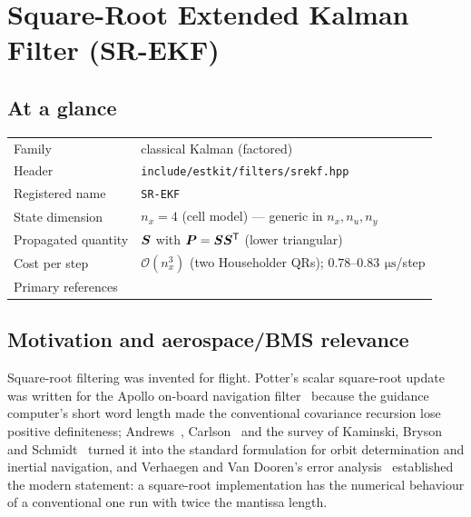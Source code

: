 \chapter{Square-Root Extended Kalman Filter (SR-EKF)}
\label{ch:srekf}

\section*{At a glance}
\begin{tabular}{@{}l>{\raggedright\arraybackslash}p{}@{}}
Family & classical Kalman (factored) \\
Header & \texttt{include/estkit/filters/srekf.hpp} \\
Registered name & \texttt{SR-EKF} \\
State dimension & $n_x = 4$ (cell model) --- generic in $n_x, n_u, n_y$ \\
Propagated quantity & $\bm{S}$ with $\bm{P} = \bm{S}\bm{S}^{\mathsf{T}}$ (lower triangular) \\
Cost per step & $\mathcal{O}(n_x^3)$ (two Householder QRs); $0.78$--$0.83\,\SI{}{\micro\second}$/step \\
Primary references & \cite{kaminski1971,kailath2000,potter1963,carlson1973,verhaegen1986} \\
\end{tabular}

\section{Motivation and aerospace/BMS relevance}
Square-root filtering was invented for flight. Potter's scalar square-root update was written
for the Apollo on-board navigation filter~\cite{potter1963} because the guidance computer's
short word length made the conventional covariance recursion lose positive definiteness;
Andrews~\cite{andrews1968sqrt}, Carlson~\cite{carlson1973} and the survey of Kaminski, Bryson
and Schmidt~\cite{kaminski1971} turned it into the standard formulation for orbit
determination and inertial navigation, and Verhaegen and Van Dooren's error
analysis~\cite{verhaegen1986} established the modern statement: a square-root
implementation has the numerical behaviour of a conventional one run with twice the mantissa
length.

